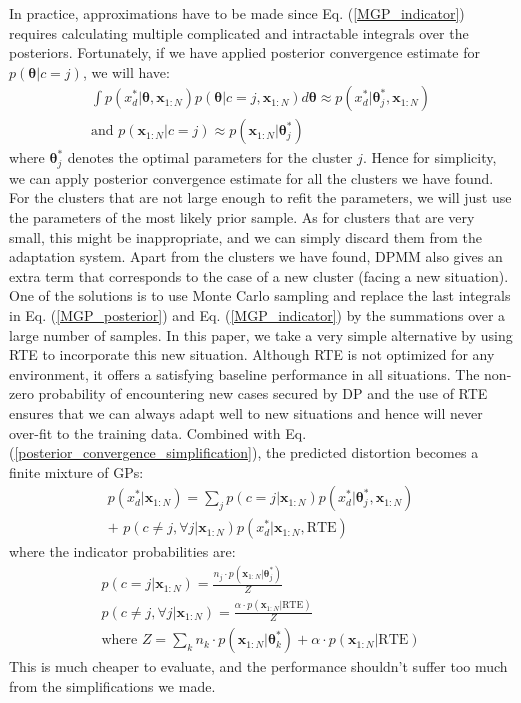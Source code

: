 In practice, approximations have to be made since Eq. (\ref{MGP_indicator}) requires calculating multiple complicated and intractable integrals over the posteriors. 
Fortunately, if we have applied posterior convergence estimate for $p(\bm{\theta}|c=j)$, we will have:
\begin{equation}
\begin{gathered}
\int p(x^*_d|\bm{\theta}, \bm{x}_{1:N})p(\bm{\theta}|c=j, \bm{x}_{1:N}) d\bm{\theta} \approx p(x^*_d|\bm{\theta}^*_j, \bm{x}_{1:N})
\\
\text{and } p(\bm{x}_{1:N}|c=j) \approx p(\bm{x}_{1:N}|\bm{\theta}^*_j)
\end{gathered}
\label{posterior_convergence_simplification}
\end{equation}
where $\bm{\theta}^*_j$ denotes the optimal parameters for the cluster $j$.
Hence for simplicity, we can apply posterior convergence estimate for all the clusters we have found.
For the clusters that are not large enough to refit the parameters, we will just use the parameters of the most likely prior sample.
As for clusters that are very small, this might be inappropriate, and we can simply discard them from the adaptation system.
Apart from the clusters we have found, DPMM also gives an extra term that corresponds to the case of a new cluster (facing a new situation).
One of the solutions is to use Monte Carlo sampling and replace the last integrals in Eq. (\ref{MGP_posterior}) and Eq. (\ref{MGP_indicator}) by the summations over a large number of samples.
In this paper, we take a very simple alternative by using RTE to incorporate this new situation.
Although RTE is not optimized for any environment, it offers a satisfying baseline performance in all situations.
The non-zero probability of encountering new cases secured by DP and the use of RTE ensures that we can always adapt well to new situations and hence will never over-fit to the training data.
Combined with Eq. (\ref{posterior_convergence_simplification}), the predicted distortion becomes a finite mixture of GPs:
\begin{equation}
\begin{gathered}
p(x^*_d|\bm{x}_{1:N}) 
= \sum_j p(c=j| \bm{x}_{1:N}) p(x^*_d|\bm{\theta}^*_j, \bm{x}_{1:N})
\\
+ \,\, p(c \neq j, \forall j|\bm{x}_{1:N})  p(x^*_d|\bm{x}_{1:N}, \text{RTE})
\end{gathered}
\label{simplified_distortion}
\end{equation}
where the indicator probabilities are:
\begin{equation}
\begin{gathered}
p(c=j| \bm{x}_{1:N}) 
= \frac{n_j \cdot p(\bm{x}_{1:N}|\bm{\theta}^*_j)
}{Z}
\\ 
p(c \neq j, \forall j| \bm{x}_{1:N})
= \frac{\alpha \cdot p(\bm{x}_{1:N}|\text{RTE})
}{Z}
\\ \text{where }
Z = \sum_k n_k \cdot p(\bm{x}_{1:N}|\bm{\theta}^*_k) + \alpha \cdot p(\bm{x}_{1:N}|\text{RTE})
\end{gathered}
\label{simplified_indicator}
\end{equation}
This is much cheaper to evaluate, and the performance shouldn't suffer too much from the simplifications we made.


